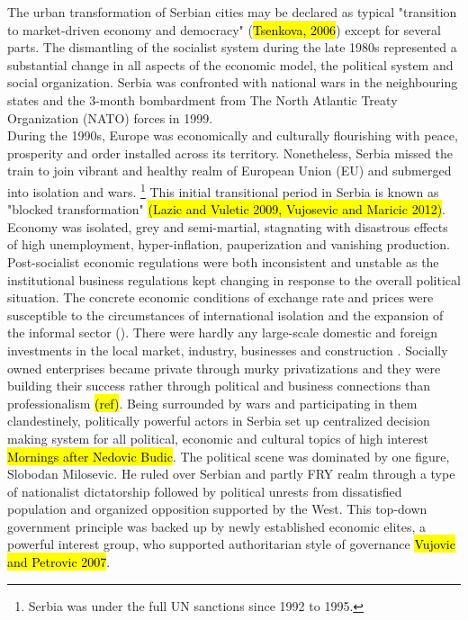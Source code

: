 \documentclass[11pt]{report}
\begin{document}
The urban transformation of Serbian cities may be declared as typical "transition to market-driven economy and democracy" (\hl{Tsenkova, 2006}) except for several parts. The dismantling of the socialist system during the late 1980s represented a substantial change in all aspects of the economic model, the political system and social organization.
Serbia was confronted with national wars in the neighbouring states and the 3-month bombardment from The North Atlantic Treaty Organization (NATO) forces in 1999.
\\
During the 1990s, Europe was economically and culturally flourishing with peace, prosperity and order installed across its territory.
Nonetheless, Serbia missed the train to join vibrant and healthy realm of European Union (EU) and submerged into isolation and wars. \footnote{Serbia was under the full UN sanctions since 1992 to 1995.} 
This initial transitional period in Serbia is known as "blocked transformation" \hl{(Lazic and Vuletic 2009, Vujosevic and Maricic 2012)}.
Economy was isolated, grey and semi-martial, stagnating with disastrous effects of high unemployment, hyper-inflation, pauperization and vanishing production.
Post-socialist economic regulations were both inconsistent and unstable as the institutional business regulations kept changing in response to the overall political situation. The concrete economic conditions of exchange rate and prices were susceptible to the circumstances of international isolation and the expansion of the informal sector (\cite{from Grozdanic find references}).
There were hardly any large-scale domestic and foreign investments in the local market, industry, businesses and construction \cite{(Vujosevic and Nedovic 2006)}.
Socially owned enterprises became private through murky privatizations and they were building their success rather through political and business connections than professionalism \hl{(ref)}.
Being surrounded by wars and participating in them clandestinely, politically powerful actors in Serbia set up centralized decision making system for all political, economic and cultural topics of high interest \hl{Mornings after Nedovic Budic}.
The political scene was dominated by one figure, Slobodan Milosevic.
He ruled over Serbian and partly FRY realm through a type of nationalist dictatorship followed by political unrests from dissatisfied population and organized opposition supported by the West.
This top-down government principle was backed up by newly established economic elites, a powerful interest group, who supported authoritarian style of governance \hl{Vujovic and Petrovic 2007}.
\end{document}
